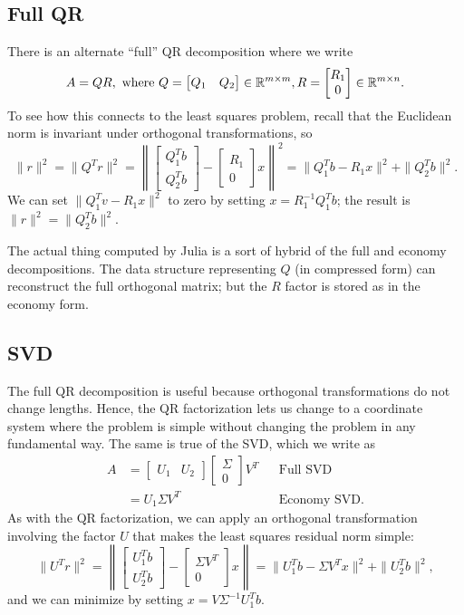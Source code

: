 \documentclass[12pt, leqno]{article}
\begin{document}
\subsection{Full QR}

There is an alternate ``full'' QR decomposition where we write
\[
A = QR, \mbox{ where }
Q = \begin{bmatrix} Q_1 & Q_2 \end{bmatrix} \in \mathbb{R}^{m \times m},
R = \begin{bmatrix} R_{1} \\ 0 \end{bmatrix} \in \mathbb{R}^{m \times n}.
\]
To see how this connects to the least squares problem, recall
that the Euclidean norm is invariant under orthogonal transformations,
so
\[
  \|r\|^2 = \|Q^T r\|^2 = \left\| \begin{bmatrix} Q_1^T b \\ Q_2^T
    b \end{bmatrix} - \begin{bmatrix} R_1 \\ 0 \end{bmatrix} x
  \right\|^2 = \|Q_1^T b-R_1x\|^2 + \|Q_2^T b\|^2.
\]
We can set $\|Q_1^T v-R_1 x\|^2$ to zero by
setting $x = R_1^{-1} Q_1^T b$; the result is
$\|r\|^2 = \|Q_2^T b\|^2$.

The actual thing computed by Julia is a sort of hybrid of the full
and economy decompositions.  The data structure representing $Q$ (in
compressed form) can reconstruct the full orthogonal matrix; but the
$R$ factor is stored as in the economy form.

\subsection{SVD}

The full QR decomposition is useful because orthogonal transformations
do not change lengths.  Hence, the QR factorization lets us change
to a coordinate system where the problem is simple without changing
the problem in any fundamental way.  The same is true of the SVD,
which we write as
\begin{align*}
A &=
\begin{bmatrix} U_1 & U_2 \end{bmatrix}
\begin{bmatrix} \Sigma \\ 0 \end{bmatrix}
V^T & & \mbox{Full SVD} \\
&= U_1 \Sigma V^T & & \mbox{Economy SVD}.
\end{align*}
As with the QR factorization, we can apply an orthogonal
transformation involving the factor $U$ that makes the
least squares residual norm simple:
\[
\|U^T r\|^2 =
\left\| \begin{bmatrix} U_1^T b \\ U_2^T b \end{bmatrix} -
\begin{bmatrix} \Sigma V^T \\ 0 \end{bmatrix} x
\right\| =
\|U_1^T b - \Sigma V^T x\|^2 + \|U_2^T b\|^2,
\]
and we can minimize by setting $x = V \Sigma^{-1} U_1^T b$.
\end{document}
